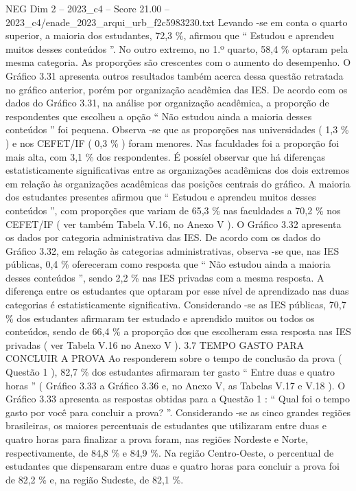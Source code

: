 \begin{textsample}{NEG Dim 2 – 2023\_c4 – Score 21.00 – 2023\_c4/enade\_2023\_arqui\_urb\_f2c5983230.txt}
Levando -se em conta o quarto superior, a maioria dos estudantes, 72,3 \%, afirmou que “ Estudou e aprendeu muitos desses conteúdos ”.
No outro extremo, no 1.º quarto, 58,4 \% optaram pela mesma categoria.
As proporções são crescentes com o aumento do desempenho.
O Gráfico 3.31 apresenta outros resultados também acerca dessa questão retratada no gráfico anterior, porém por organização acadêmica das IES.
De acordo com os dados do Gráfico 3.31, na análise por organização acadêmica, a proporção de respondentes que escolheu a opção “ Não estudou ainda a maioria desses conteúdos ” foi pequena.
Observa -se que as proporções nas universidades ( 1,3 \% ) e nos CEFET/IF ( 0,3 \% ) foram menores.
Nas faculdades foi a proporção foi mais alta, com 3,1 \% dos respondentes.
É possíel observar que há diferenças estatisticamente significativas entre as organizações acadêmicas dos dois extremos em relação às organizações acadêmicas das posições centrais do gráfico.
A maioria dos estudantes presentes afirmou que “ Estudou e aprendeu muitos desses conteúdos ”, com proporções que variam de 65,3 \% nas faculdades a 70,2 \% nos CEFET/IF ( ver também Tabela V.16, no Anexo V ).
O Gráfico 3.32 apresenta os dados por categoria administrativa das IES.
De acordo com os dados do Gráfico 3.32, em relação às categorias administrativas, observa -se que, nas IES públicas, 0,4 \% ofereceram como resposta que “ Não estudou ainda a maioria desses conteúdos ”, sendo 2,2 \% nas IES privadas com a mesma resposta.
A diferença entre os estudantes que optaram por esse nível de aprendizado nas duas categorias é estatisticamente significativa.
Considerando -se as IES públicas, 70,7 \% dos estudantes afirmaram ter estudado e aprendido muitos ou todos os conteúdos, sendo de 66,4 \% a proporção dos que escolheram essa resposta nas IES privadas ( ver Tabela V.16 no Anexo V ). 3.7 TEMPO GASTO PARA CONCLUIR A PROVA Ao responderem sobre o tempo de conclusão da prova ( Questão 1 ), 82,7 \% dos estudantes afirmaram ter gasto “ Entre duas e quatro horas ” ( Gráfico 3.33 a Gráfico 3.36 e, no Anexo V, as Tabelas V.17 e V.18 ).
O Gráfico 3.33 apresenta as respostas obtidas para a Questão 1 : “ Qual foi o tempo gasto por você para concluir a prova? ”.
Considerando -se as cinco grandes regiões brasileiras, os maiores percentuais de estudantes que utilizaram entre duas e quatro horas para finalizar a prova foram, nas regiões Nordeste e Norte, respectivamente, de 84,8 \% e 84,9 \%.
Na região Centro-Oeste, o percentual de estudantes que dispensaram entre duas e quatro horas para concluir a prova foi de 82,2 \% e, na região Sudeste, de 82,1 \%.

\end{textsample}
